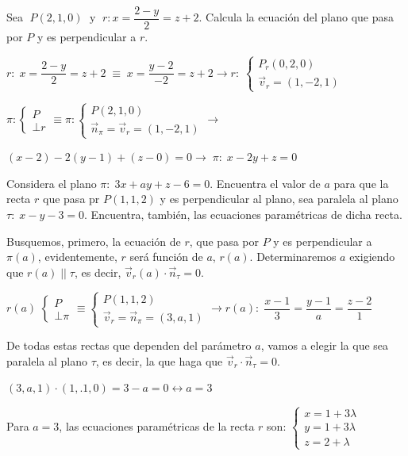 \begin{ejre}
	Sea $\;P(2,1,0) \;\text{ y }\; r: x=\dfrac{2-y}{2}=z+2$. Calcula la ecuación del plano que pasa por $P$ y es perpendicular a $r$.

\end{ejre}

\begin{proofw}\renewcommand{\qedsymbol}{$\diamond$}
	$r:\; x=\dfrac{2-y}{2}=z+2 \;\equiv \; x=\dfrac{y-2}{-2}=z+2 \to r:\; \begin{cases} P_r(0,2,0) \\ \vec v_r=(1,-2,1) \end{cases}$
	
\noindent $\pi:\begin{cases} P \\ \bot r \end{cases} \equiv \pi:\begin{cases} P(2,1,0) \\ \vec n_{\pi}=\vec v_r=(1,-2,1) \end{cases} \to$

\noindent $(x-2)-2(y-1)+(z-0)=0 \to \; \pi:\; x-2y+z=0$
\end{proofw}


\begin{ejre}
	Considera el plano $\pi:\; 3x+ay+z-6=0$. Encuentra el valor de $a$ para que la recta $r$ que pasa pr $P(1,1,2)$ y es perpendicular al plano, sea paralela al plano $\tau:\; x-y-3=0$. Encuentra, también, las ecuaciones paramétricas de dicha recta.
\end{ejre}

\begin{proofw}\renewcommand{\qedsymbol}{$\diamond$}
	Busquemos, primero, la ecuación de $r$, que pasa por $P$ y es perpendicular a $\pi(a)$, evidentemente, $r$ será función de $a$, $r(a)$. Determinaremos $a$ exigiendo que $r(a)\;||\;\tau$, es decir, $\vec v_r(a) \cdot \vec n_{\tau}=0$.
	
\noindent $r(a)\; \begin{cases} P \\ \bot \pi \end{cases} \equiv \begin{cases} P(1,1,2) \\ \vec v_r=\vec n_{\pi}=(3,a,1) \end{cases} \to r(a):\; \dfrac{x-1}{3}=\dfrac{y-1}{a}=\dfrac{z-2}{1}$

\noindent De todas estas rectas que dependen del parámetro $a$, vamos a elegir la que sea paralela al plano $\tau$, es decir, la que haga que $\vec v_r \cdot \vec n_{\tau}=0$.

\noindent  $(3,a,1)\cdot (1,.1,0)=3-a=0 \leftrightarrow a=3$

\noindent Para $a=3$, las ecuaciones paramétricas de la recta $r$ son: $ \begin{cases} x=1+3\lambda\\y=1+3\lambda\\z=2+\lambda \end{cases}$ 
	
	
\end{proofw}


